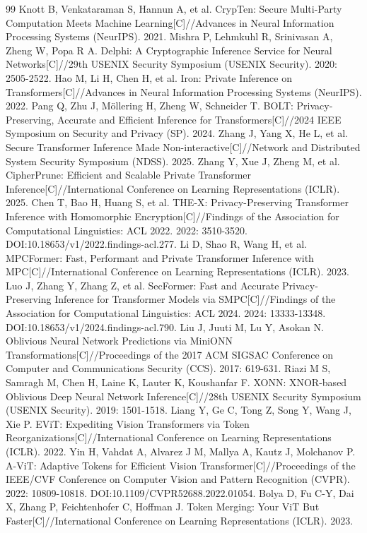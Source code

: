 \begin{thebibliography}{99}
 Knott B, Venkataraman S, Hannun A, et al. CrypTen: Secure Multi-Party Computation Meets Machine Learning[C]//Advances in Neural Information Processing Systems (NeurIPS). 2021.
 Mishra P, Lehmkuhl R, Srinivasan A, Zheng W, Popa R A. Delphi: A Cryptographic Inference Service for Neural Networks[C]//29th USENIX Security Symposium (USENIX Security). 2020: 2505-2522.
 Hao M, Li H, Chen H, et al. Iron: Private Inference on Transformers[C]//Advances in Neural Information Processing Systems (NeurIPS). 2022.
 Pang Q, Zhu J, Möllering H, Zheng W, Schneider T. BOLT: Privacy-Preserving, Accurate and Efficient Inference for Transformers[C]//2024 IEEE Symposium on Security and Privacy (SP). 2024.
 Zhang J, Yang X, He L, et al. Secure Transformer Inference Made Non-interactive[C]//Network and Distributed System Security Symposium (NDSS). 2025.
 Zhang Y, Xue J, Zheng M, et al. CipherPrune: Efficient and Scalable Private Transformer Inference[C]//International Conference on Learning Representations (ICLR). 2025.
 Chen T, Bao H, Huang S, et al. THE-X: Privacy-Preserving Transformer Inference with Homomorphic Encryption[C]//Findings of the Association for Computational Linguistics: ACL 2022. 2022: 3510-3520. DOI:10.18653/v1/2022.findings-acl.277.
 Li D, Shao R, Wang H, et al. MPCFormer: Fast, Performant and Private Transformer Inference with MPC[C]//International Conference on Learning Representations (ICLR). 2023.
 Luo J, Zhang Y, Zhang Z, et al. SecFormer: Fast and Accurate Privacy-Preserving Inference for Transformer Models via SMPC[C]//Findings of the Association for Computational Linguistics: ACL 2024. 2024: 13333-13348. DOI:10.18653/v1/2024.findings-acl.790.
 Liu J, Juuti M, Lu Y, Asokan N. Oblivious Neural Network Predictions via MiniONN Transformations[C]//Proceedings of the 2017 ACM SIGSAC Conference on Computer and Communications Security (CCS). 2017: 619-631.
 Riazi M S, Samragh M, Chen H, Laine K, Lauter K, Koushanfar F. XONN: XNOR-based Oblivious Deep Neural Network Inference[C]//28th USENIX Security Symposium (USENIX Security). 2019: 1501-1518.
 Liang Y, Ge C, Tong Z, Song Y, Wang J, Xie P. EViT: Expediting Vision Transformers via Token Reorganizations[C]//International Conference on Learning Representations (ICLR). 2022.
 Yin H, Vahdat A, Alvarez J M, Mallya A, Kautz J, Molchanov P. A-ViT: Adaptive Tokens for Efficient Vision Transformer[C]//Proceedings of the IEEE/CVF Conference on Computer Vision and Pattern Recognition (CVPR). 2022: 10809-10818. DOI:10.1109/CVPR52688.2022.01054.
 Bolya D, Fu C-Y, Dai X, Zhang P, Feichtenhofer C, Hoffman J. Token Merging: Your ViT But Faster[C]//International Conference on Learning Representations (ICLR). 2023.
\end{thebibliography}
